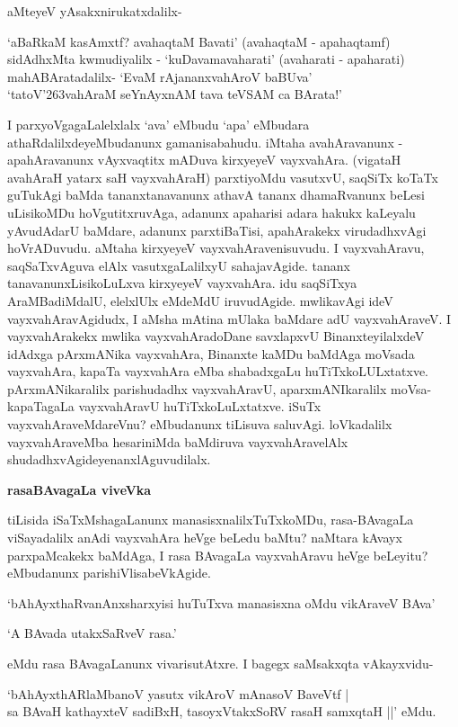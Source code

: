 aMteyeV yAsakxnirukatxdalilx-

\begin{shloka}
`aBaRkaM kasAmxtf? avahaqtaM Bavati' (avahaqtaM - apahaqtamf)\\
sidAdhxMta kwmudiyalilx - `kuDavamavaharati' (avaharati - apaharati)\\
mahABAratadalilx- `EvaM rAjananxvahAroV baBUva'\\
`tatoV\char'263vahAraM seYnAyxnAM tava teVSAM ca BArata!'
\end{shloka}

I parxyoVgagaLalelxlalx `ava' eMbudu `apa' eMbudara athaRdalilxdeyeMbudanunx gamanisabahudu. iMtaha avahAravanunx - apahAravanunx vAyxvaqtitx mADuva kirxyeyeV vayxvahAra. (vigataH avahAraH yatarx saH vayxvahAraH) parxtiyoMdu vasutxvU, saqSiTx koTaTx guTukAgi baMda tananxtanavanunx athavA tananx dhamaRvanunx beLesi uLisikoMDu hoVgutitxruvAga, adanunx apaharisi adara hakukx kaLeyalu yAvudAdarU baMdare, adanunx parxtiBaTisi, apahArakekx virudadhxvAgi hoVrADuvudu. aMtaha kirxyeyeV vayxvahAravenisuvudu. I vayxvahAravu, saqSaTxvAguva elAlx vasutxgaLalilxyU sahajavAgide. tananx tanavanunxLisikoLuLxva kirxyeyeV vayxvahAra. idu saqSiTxya AraMBadiMdalU, elelxlUlx eMdeMdU iruvudAgide. mwlikavAgi ideV vayxvahAravAgidudx, I aMsha mAtina mUlaka baMdare adU vayxvahAraveV. I vayxvahArakekx mwlika vayxvahAradoDane savxlapxvU BinanxteyilalxdeV idAdxga pArxmANika vayxvahAra, Binanxte kaMDu baMdAga moVsada vayxvahAra, kapaTa vayxvahAra eMba shabadxgaLu huTiTxkoLULxtatxve. pArxmANikaralilx parishudadhx vayxvahAravU, aparxmANIkaralilx moVsa-kapaTagaLa vayxvahAravU huTiTxkoLuLxtatxve. iSuTx vayxvahAraveMdareVnu? eMbudanunx tiLisuva saluvAgi. loVkadalilx vayxvahAraveMba hesariniMda baMdiruva vayxvahAravelAlx shudadhxvAgideyenanxlAguvudilalx.

{\bf rasaBAvagaLa viveVka}

tiLisida iSaTxMshagaLanunx manasisxnalilxTuTxkoMDu, rasa-BAvagaLa viSayadalilx anAdi vayxvahAra heVge beLedu baMtu? naMtara kAvayx parxpaMcakekx baMdAga, I rasa BAvagaLa vayxvahAravu heVge beLeyitu? eMbudanunx parishiVlisabeVkAgide.

`bAhAyxthaRvanAnxsharxyisi huTuTxva manasisxna oMdu vikAraveV BAva'

`A BAvada utakxSaRveV rasa.'

eMdu rasa BAvagaLanunx vivarisutAtxre. I bagegx saMsakxqta vAkayxvidu-

\begin{shloka}
`bAhAyxthARlaMbanoV yasutx vikAroV mAnasoV BaveVtf |\\
sa BAvaH kathayxteV sadiBxH, tasoyxVtakxSoRV rasaH samxqtaH ||' eMdu.
\end{shloka}

